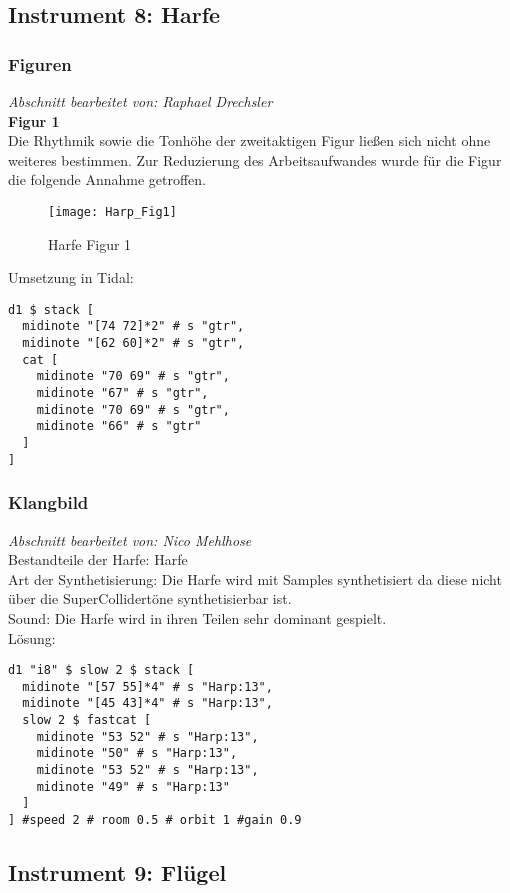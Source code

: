 \documentclass[
10pt, %
a4paper, %
oneside, %
headinclude,footinclude, %
BCOR5mm, %
]{scrartcl}
\begin{document}
\subsection{Instrument 8: Harfe}
\subsubsection{Figuren}
\textit{Abschnitt bearbeitet von: Raphael Drechsler}\\

\noindent\textbf{Figur 1}\\
Die Rhythmik sowie die Tonhöhe der zweitaktigen Figur ließen sich nicht ohne weiteres bestimmen. Zur Reduzierung des Arbeitsaufwandes wurde für die Figur die folgende Annahme getroffen. 
\begin{figure}[h]
	\centering 
	\texttt{[image: Harp\_Fig1]} 
	\caption{Harfe Figur 1}
\end{figure}

\noindent Umsetzung in Tidal:
\begin{lstlisting}
d1 $ stack [
  midinote "[74 72]*2" # s "gtr",
  midinote "[62 60]*2" # s "gtr",
  cat [
    midinote "70 69" # s "gtr",
    midinote "67" # s "gtr",
    midinote "70 69" # s "gtr",
    midinote "66" # s "gtr"
  ]
] 
\end{lstlisting}



\subsubsection{Klangbild}
\textit{Abschnitt bearbeitet von: Nico Mehlhose}\\
\noindent Bestandteile der Harfe: Harfe\\
Art der Synthetisierung: Die Harfe wird mit Samples\cite{Orch} synthetisiert da diese nicht über die SuperCollidertöne synthetisierbar ist.\\
Sound: Die Harfe wird in ihren Teilen sehr dominant gespielt.\\
Lösung:
\begin{lstlisting}
d1 "i8" $ slow 2 $ stack [
  midinote "[57 55]*4" # s "Harp:13",
  midinote "[45 43]*4" # s "Harp:13",
  slow 2 $ fastcat [
    midinote "53 52" # s "Harp:13",
    midinote "50" # s "Harp:13",
    midinote "53 52" # s "Harp:13",
    midinote "49" # s "Harp:13"
  ]
] #speed 2 # room 0.5 # orbit 1 #gain 0.9
\end{lstlisting}


\subsection{Instrument 9: Flügel}
\end{document}
